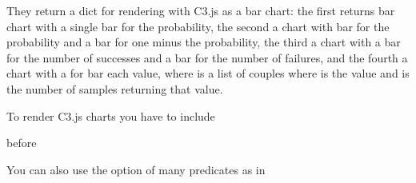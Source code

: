 \documentclass[letterpaper,10pt,english]{sphinxmanual}
\begin{document}
\begin{sphinxVerbatim}[commandchars=\\\{\}]
  
  
  
  
\end{sphinxVerbatim}

\sphinxAtStartPar
They return a dict for rendering with C3.js as a bar chart: the first returns bar chart with a single bar for the probability, the second a chart with bar for the probability and a bar for one minus the probability, the third a chart with a bar for the number of successes and a bar for the number of failures, and the fourth a chart with a for bar each value, where  is a list of couples  where  is the value and  is the number of samples returning that value.

\sphinxAtStartPar
To render C3.js charts you have to include

\begin{sphinxVerbatim}[commandchars=\\\{\}]
 
\end{sphinxVerbatim}

\sphinxAtStartPar
before 

\sphinxAtStartPar
You can also use the  option of many predicates as in

\begin{sphinxVerbatim}[commandchars=\\\{\}]
 \PYG{p}{[}\PYG{p}{]}
\end{sphinxVerbatim}
\end{document}
